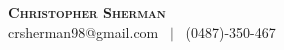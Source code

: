\documentclass[letterpaper,12pt]{res}
\begin{document}
\noindent \textbf{\Huge \scshape Christopher Sherman} \\ 
crsherman98@gmail.com \ $|$ \ (0487)-350-467  \\











 
\end{document}
